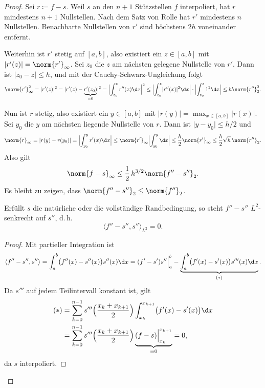 \documentclass[11pt]{article}
\begin{document}
\begin{proof}
  Sei $r \coloneqq f - s$. Weil $s$ an den $n+1$ Stützstellen $f$ interpoliert, hat $r$ mindestens $n+1$ Nullstellen. Nach dem Satz von Rolle hat $r'$ mindestens $n$ Nullstellen. Benachbarte Nullstellen von $r'$ sind höchstens $2h$ voneinander entfernt.

  Weiterhin ist $r'$ stetig auf $[a, b]$, also existiert ein $z \in [a, b]$ mit $\lvert r'(z) \rvert = \norm{r'}_\infty$. Sei $z_0$ die $z$ am nächsten gelegene Nullstelle von $r'$. Dann ist $\lvert z_0 - z \rvert \le h$, und mit der Cauchy-Schwarz-Ungleichung folgt
\begin{align*}
    \norm{r'}_\infty^2 = \lvert r'(z) \rvert^2 = \lvert r'(z) - \underbrace{r'(z_0)}_{= 0} \rvert^2
    = \Bigl\lvert \int_{z_0}^{z} r''(x) \d x \Bigr\rvert^2
    \le \Bigl\lvert \int_{z_0}^{z} \lvert r''(x) \rvert^2 \d x \Bigr\rvert \cdot \Bigl\lvert \int_{z_0}^{z} 1^2 \d x \Bigr\rvert
    \le h \norm{r''}_2^2.
  \end{align*}


  Nun ist $r$ stetig, also existiert ein $y \in [a, b]$ mit $\lvert r(y) \rvert = \max_{x \in [a, b]} \lvert r(x) \rvert$. Sei $y_0$ die $y$ am nächsten liegende Nullstelle von $r$. Dann ist $\lvert y - y_0 \rvert \le h/2$ und
  \[
    \norm{r}_\infty = \lvert r(y) - r(y_0) \rvert = \Bigl\lvert \int_{y_0}^{y} r'(x) \d x \Bigr\rvert
    \le \norm{r'}_\infty \Bigl\lvert \int_{y_0}^{y} \d x \Bigr\rvert
    \le \frac{h}{2} \norm{r'}_\infty \le \frac{h}{2} \sqrt{h}\, \norm{r''}_2.
  \]
Also gilt
  \[ \norm{f - s}_\infty \le \frac{1}{2}\, h^{3/2} \norm{f'' - s''}_2. \]
Es bleibt zu zeigen, dass $\norm{f'' - s''}_2 \le \norm{f''}_2$.

  \begin{lemma}[Orthogonalität]\Theorem
    Erfüllt $s$ die natürliche oder die vollständige Randbedingung, so steht $f'' - s''$ $L^2$-senkrecht auf $s''$, d.\,h.
    \[ \langle f'' - s'', s'' \rangle_{L^2} = 0. \]
  \end{lemma}


  \begin{proof}
    Mit partieller Integration ist
    \[
      \langle f'' - s'', s'' \rangle = \int_a^b \bigl(f''(x) - s''(x)\bigr) s''(x) \d x
      = (f' - s') s'' \Big|_a^b - \underbrace{\int_a^b \bigl(f'(x) - s'(x)\bigr) s'''(x) \d x}_{(\ast)}.
    \]
Da $s'''$ auf jedem Teilintervall konstant ist, gilt
    \begin{align*}
      (\ast) &= \sum_{k=0}^{n-1} s'''\Bigl(\frac{x_k + x_{k+1}}{2}\Bigr) \int_{x_k}^{x_{k+1}} \bigl(f'(x) - s'(x)\bigr) \d x \\
      &= \sum_{k=0}^{n-1} s'''\Bigl(\frac{x_k + x_{k+1}}{2}\Bigr) \underbrace{(f - s) \Big|_{x_k}^{x_{k+1}}}_{= 0} = 0,
    \end{align*}
    da $s$ interpoliert.



\end{proof}
\end{proof}
\end{document}
